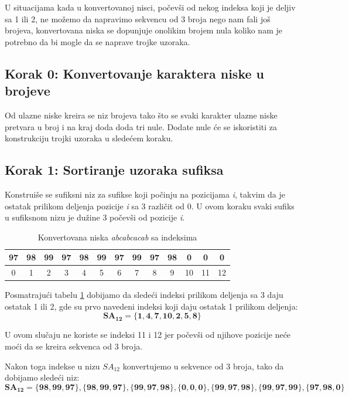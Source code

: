 \documentclass[serbian]{article}
\begin{document}
U situacijama kada u konvertovanoj nisci, počevši od nekog indeksa koji je deljiv sa 1 ili 2, ne možemo da napravimo sekvencu od 3 broja nego nam fali još brojeva, konvertovana niska se dopunjuje onolikim brojem nula koliko nam je potrebno da bi mogle da se naprave trojke uzoraka.

 \subsection{Korak 0: Konvertovanje karaktera niske u brojeve}
Od ulazne niske kreira se niz brojeva tako što se svaki karakter ulazne niske pretvara u broj i na kraj doda doda tri nule. Dodate nule će se iskoristiti za konstrukciju trojki uzoraka u sledećem koraku.

\subsection{Korak 1: Sortiranje uzoraka sufiksa}
Konstruiše se sufiksni niz za sufikse koji počinju na pozicijama \textit{i}, takvim da je ostatak prilikom deljenja pozicije \textit{i} sa 3 različit od 0. U ovom koraku svaki sufiks u sufiksnom nizu je dužine 3 počevši od pozicije \textit{i}.

\begin{table}[h!]
    \begin{center}
        \begin{tabular}{|c|c|c|c|c|c|c|c|c|c|c|c|c|} \hline
        97 & 98 & 99 & 97 & 98 & 99 & 97 & 99 & 97 & 98 & 0 & 0 & 0\\ \hline
        0 & 1 & 2 & 3 & 4 & 5 & 6 & 7 & 8 & 9 & 10 & 11 & 12\\ \hline
        \end{tabular}
        \caption{Konvertovana niska \textit{abcabcacab} sa indeksima}
        \label{table:2}
    \end{center}
\end{table}

Posmatrajući tabelu \ref{table:2} dobijamo da sledeći indeksi prilikom deljenja sa 3 daju ostatak 1 ili 2, gde su prvo navedeni indeksi koji daju ostatak 1 prilikom deljenja:
\begin{equation}
\mathbf{SA_{12} = \{1, 4, 7, 10, 2, 5, 8\}}
\end{equation}

U ovom slučaju ne koriste se indeksi 11 i 12 jer počevši od njihove pozicije neće moći da se kreira sekvenca od 3 broja.

Nakon toga indekse u nizu \(SA_{12}\) konvertujemo u sekvence od 3 broja, tako da dobijamo sledeći niz:
\begin{equation}
\mathbf{SA_{12} = \{98, 99, 97\}, \{98, 99, 97\}, \{99, 97, 98\} , \{0, 0, 0\} , \{99, 97, 98\} , \{99, 97, 99\} , \{97, 98, 0\} }
\end{equation}
\end{document}
